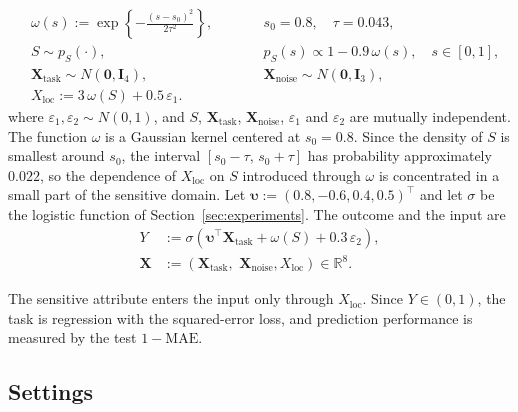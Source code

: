 \documentclass{article} %
\begin{document}
\begin{equation}
\begin{alignedat}{2}
  &\omega(s):=\exp\!\left\{-\frac{(s-s_0)^2}{2\tau^2}\right\},
  &\qquad&
  s_0=0.8,\quad \tau=0.043,\\
  &S\sim p_S(\cdot),
  &\qquad&
  p_S(s)\propto 1-0.9\,\omega(s),\quad s\in[0,1],\\
  &\mathbf{X}_{\mathrm{task}}\sim N(\mathbf{0},\mathbf{I}_4),
  &\qquad&
  \mathbf{X}_{\mathrm{noise}}\sim N(\mathbf{0},\mathbf{I}_3),\\
  &X_{\mathrm{loc}}:=3\,\omega(S)+0.5\,\varepsilon_1.
\end{alignedat}
\label{eq:synth-common}
\end{equation}
where $\varepsilon_1, \varepsilon_2\sim N(0,1)$, and $S$, $\mathbf{X}_{\mathrm{task}}$, $\mathbf{X}_{\mathrm{noise}}$, $\varepsilon_1$ and $\varepsilon_2$ are mutually independent.
The function $\omega$ is a Gaussian kernel centered at $s_0=0.8$.  Since the density of $S$ is smallest around $s_0$, the interval
$[s_0-\tau,\,s_0+\tau]$ has probability approximately $0.022$, so the dependence of $X_{\mathrm{loc}}$ on $S$ introduced through $\omega$ is concentrated in a small part of the sensitive domain.  Let $\boldsymbol{\upsilon}:=(0.8,-0.6,0.4,0.5)^\top$ and let $\sigma$ be the logistic function of Section~\ref{sec:experiments}.  The outcome and the input are
\begin{equation}
\begin{aligned}
  Y &:= \sigma\!\left(\boldsymbol{\upsilon}^\top\mathbf{X}_{\mathrm{task}}+\omega(S) + 0.3\,\varepsilon_2\right), \\
  \mathbf{X} &:= (\mathbf{X}_{\mathrm{task}},\, \, \mathbf{X}_{\mathrm{noise}}, X_{\mathrm{loc}}) \in \mathbb{R}^{8}.
\end{aligned}
\label{eq:synth-linear}
\end{equation}


The sensitive attribute enters the input only through $X_{\mathrm{loc}}$.
 Since $Y\in(0,1)$, the task is regression with the squared-error loss, and prediction performance is measured by the test $1-\mathrm{MAE}$.

\subsection{Settings}
\label{app:synth-settings}
\end{document}
